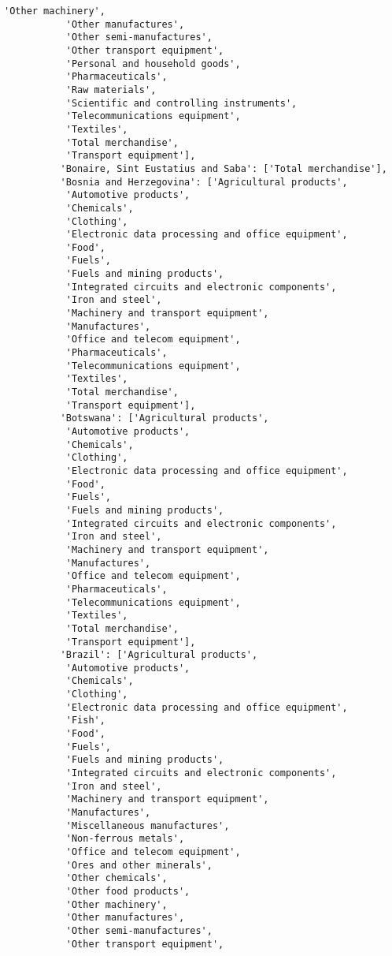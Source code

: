 \documentclass[11pt]{article}
\begin{document}
\begin{Verbatim}[commandchars=\\\{\}]
           'Other machinery',
           'Other manufactures',
           'Other semi-manufactures',
           'Other transport equipment',
           'Personal and household goods',
           'Pharmaceuticals',
           'Raw materials',
           'Scientific and controlling instruments',
           'Telecommunications equipment',
           'Textiles',
           'Total merchandise',
           'Transport equipment'],
          'Bonaire, Sint Eustatius and Saba': ['Total merchandise'],
          'Bosnia and Herzegovina': ['Agricultural products',
           'Automotive products',
           'Chemicals',
           'Clothing',
           'Electronic data processing and office equipment',
           'Food',
           'Fuels',
           'Fuels and mining products',
           'Integrated circuits and electronic components',
           'Iron and steel',
           'Machinery and transport equipment',
           'Manufactures',
           'Office and telecom equipment',
           'Pharmaceuticals',
           'Telecommunications equipment',
           'Textiles',
           'Total merchandise',
           'Transport equipment'],
          'Botswana': ['Agricultural products',
           'Automotive products',
           'Chemicals',
           'Clothing',
           'Electronic data processing and office equipment',
           'Food',
           'Fuels',
           'Fuels and mining products',
           'Integrated circuits and electronic components',
           'Iron and steel',
           'Machinery and transport equipment',
           'Manufactures',
           'Office and telecom equipment',
           'Pharmaceuticals',
           'Telecommunications equipment',
           'Textiles',
           'Total merchandise',
           'Transport equipment'],
          'Brazil': ['Agricultural products',
           'Automotive products',
           'Chemicals',
           'Clothing',
           'Electronic data processing and office equipment',
           'Fish',
           'Food',
           'Fuels',
           'Fuels and mining products',
           'Integrated circuits and electronic components',
           'Iron and steel',
           'Machinery and transport equipment',
           'Manufactures',
           'Miscellaneous manufactures',
           'Non-ferrous metals',
           'Office and telecom equipment',
           'Ores and other minerals',
           'Other chemicals',
           'Other food products',
           'Other machinery',
           'Other manufactures',
           'Other semi-manufactures',
           'Other transport equipment',

\end{Verbatim}
\end{document}
